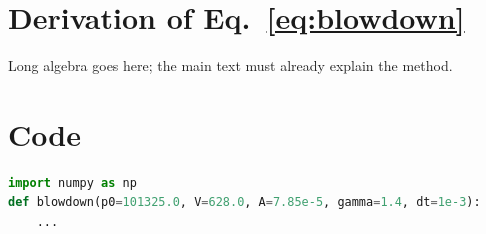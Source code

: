 \documentclass[12pt,letterpaper]{article}
\newif\ifaiused
\begin{document}
\appendix
\section{Derivation of Eq.~\eqref{eq:blowdown}}
\label{app:derivation}
Long algebra goes here; the main text must already explain the method.

\section{Code}
\label{app:code}
\begin{lstlisting}[language=Python,caption={Integration of Eq.~\eqref{eq:blowdown}.}]
import numpy as np
def blowdown(p0=101325.0, V=628.0, A=7.85e-5, gamma=1.4, dt=1e-3):
    ...
\end{lstlisting}

\ifaiused
\section*{Report on the Use of AI}
\addcontentsline{toc}{section}{Report on the Use of AI}

\noindent\textbf{Systems:} \verb|GPT-5| (OpenAI, 2025-10), web chat.

\subsection*{Work carried out without AI}
State here what the team did itself; see the project template for the
wording used in gold papers.

\subsection*{Queries (verbatim)}
\paragraph{Query 1.}
\begin{lstlisting}[style=aiquote]
<paste the exact text typed into the tool>
\end{lstlisting}

\subsection*{Outputs (complete)}
\paragraph{Output 1.}
\begin{lstlisting}[style=aiquote]
<paste the complete output>
\end{lstlisting}
\fi
\end{document}
